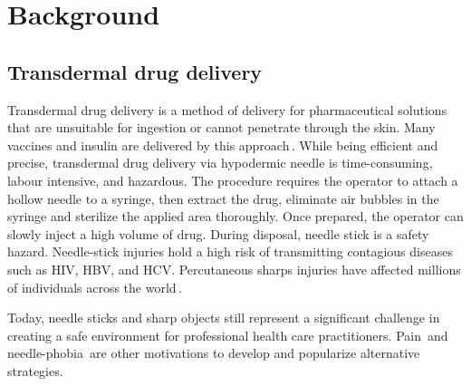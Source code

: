 \chapter{Background}                                \label{Chapter:background}


\section{Transdermal drug delivery}                 \label{Chapter:background/transdermal drug delivery}

    Transdermal drug delivery is a method of delivery for pharmaceutical solutions that are unsuitable for ingestion or cannot penetrate through the skin. Many vaccines and insulin are delivered by this approach\,\cite{sadrzadeh2007}. While being efficient and precise, transdermal drug delivery via hypodermic needle is time-consuming, labour intensive, and hazardous. The procedure requires the operator to attach a hollow needle to a syringe, then extract the drug, eliminate air bubbles in the syringe and sterilize the applied area thoroughly. Once prepared, the operator can slowly inject a high volume of drug. During disposal, needle stick is a safety hazard. Needle-stick injuries hold a high risk of transmitting contagious diseases such as HIV, HBV, and HCV. Percutaneous sharps injuries have affected millions of individuals across the world\,\cite{pruss2005}. 
    
    Today, needle sticks and sharp objects still represent a significant challenge in creating a safe environment for professional health care practitioners. Pain\,\cite{schneider1994} and needle-phobia\,\cite{hamilton2005,Nir2003} are other motivations to develop and popularize alternative strategies.
    
